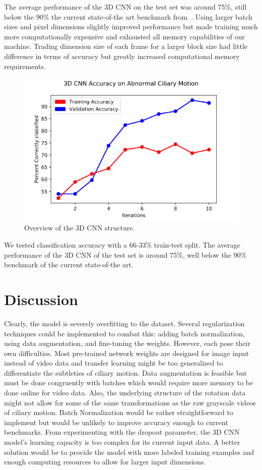The average performance of the 3D CNN on the test set was around 75\%, still below the 90\% the current state-of-the art benchmark from~\cite{quinn2015automated}. Using larger batch sizes and pixel dimensions slightly improved performance but made training much more computationally expensive and exhausted all memory capabilities of our machine. Trading dimension size of each frame for a larger block size had little difference in terms of accuracy but greatly increased computational memory requirements.  

\begin{figure}[H]
\includegraphics[scale=0.5]{CNN_graph}
\caption{Overview of the 3D CNN structure.}

\end{figure}

We tested classification accuracy with a 66-33\% train-test split. The average performance of the 3D CNN of the test set is around 75\%, well below the 90\% benchmark of the current state-of-the art. 

\section{Discussion}

Clearly, the model is severely overfitting to the dataset. Several regularization techniques could be implemented to combat this: adding batch normalization, using data augmentation, and fine-tuning the weights. However, each pose their own difficulties. Most pre-trained network weights are designed for image input instead of video data and transfer learning \cite{pan2010survey} might be too generalized to differentiate the subtleties of ciliary motion. Data augmentation is feasible but must be done congruently with batches which would require more memory to be done online for video data. Also, the underlying structure of the rotation data might not allow for some of the same transformations as the raw grayscale videos of ciliary motion. Batch Normalization \cite{ioffe2015batch} would be rather straightforward to implement but would be unlikely to improve accuracy enough to current benchmarks. From experimenting with the dropout parameter, the 3D CNN model's learning capacity is too complex for its current input data. A better solution would be to provide the model with more labeled training examples and enough computing resources to allow for larger input dimensions. 
 
